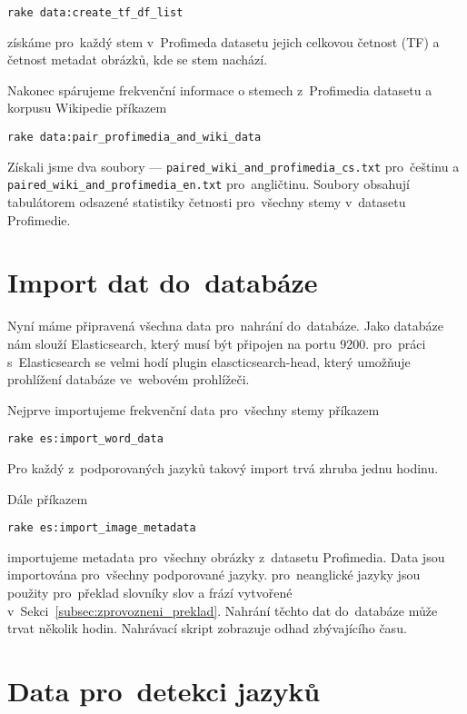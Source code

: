 \begin{lstlisting}
rake data:create_tf_df_list
\end{lstlisting}

získáme pro~každý stem v~Profimeda datasetu jejich celkovou četnost (TF) a četnost metadat obrázků, kde se stem nachází.

Nakonec spárujeme frekvenční informace o stemech z~Profimedia datasetu a korpusu Wikipedie příkazem

\begin{lstlisting}
rake data:pair_profimedia_and_wiki_data
\end{lstlisting}

Získali jsme dva soubory --- \lstinline{paired_wiki_and_profimedia_cs.txt} pro~češtinu a \lstinline{paired_wiki_and_profimedia_en.txt} pro~angličtinu. Soubory obsahují tabulátorem odsazené statistiky četnosti pro~všechny stemy v~datasetu Profimedie.

\section{Import dat do~databáze}
\label{subsec:zprovozneni_import}

Nyní máme připravená všechna data pro~nahrání do~databáze. Jako databáze nám slouží Elasticsearch, který musí být připojen na portu 9200. pro~práci s~Elasticsearch se velmi hodí plugin elascticsearch-head, který umožňuje prohlížení databáze ve~webovém prohlížeči.

Nejprve importujeme frekvenční data pro~všechny stemy příkazem

\begin{lstlisting}
rake es:import_word_data
\end{lstlisting}

Pro každý z~podporovaných jazyků takový import trvá zhruba jednu hodinu.

Dále příkazem

\begin{lstlisting}
rake es:import_image_metadata
\end{lstlisting}

importujeme metadata pro~všechny obrázky z~datasetu Profimedia. Data jsou importována pro~všechny podporované jazyky. pro~neanglické jazyky jsou použity pro~překlad slovníky slov a frází vytvořené v~Sekci~\ref{subsec:zprovozneni_preklad}. Nahrání těchto dat do~databáze může trvat několik hodin. Nahrávací skript zobrazuje odhad zbývajícího času.

\section{Data pro~detekci jazyků}
\label{subsec:zprovozneni_detekce}

